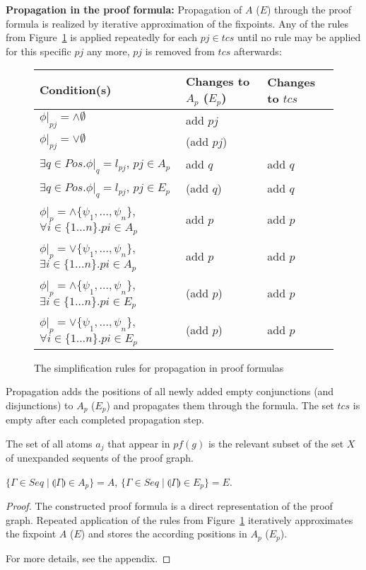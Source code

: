 \documentclass{llncs}
\newcommand{\ind}[1]{\llparenthesis #1 \rrparenthesis}
\begin{document}
\noindent\textbf{Propagation in the proof formula:}
Propagation of $A$ ($E$) through the proof formula is realized by iterative approximation of the
fixpoints. 
Any of the rules from Figure~\ref{fig:propagation} is applied repeatedly for each $pj\in tcs$ until
no rule may be applied for this specific $pj$ any more, $pj$ is removed from $tcs$ afterwards:
\begin{footnotesize}
\begin{figure}[!h]
  \begin{center}
\begin{tabular}{| l | l | l |}
\hline
Condition(s) & Changes to $A_p$ ($E_p$) & Changes to $tcs$\\
\hline
$\phi|_{pj}=\wedge\emptyset$ & add $pj$&\\
\hline
$\phi|_{pj}=\vee\emptyset$ & (add $pj$)&\\
\hline
$\exists q\in Pos.\phi|_{q}=l_{pj}$, $pj\in A_p$ & add $q$ & add $q$\\
\hline
$\exists q\in Pos.\phi|_{q}=l_{pj}$, $pj\in E_p$ & (add $q$) & add $q$\\
\hline
$\phi|_{p}=\wedge\{\psi_1,\ldots,\psi_n\}$, $\forall i\in\{1\ldots n\}. pi\in A_p$ & add $p$ & add $p$\\
\hline
$\phi|_{p}=\vee\{\psi_1,\ldots,\psi_n\}$, $\exists i\in\{1\ldots n\}. pi\in A_p$ & add $p$ & add $p$\\
\hline
$\phi|_{p}=\wedge\{\psi_1,\ldots,\psi_n\}$, $\exists i\in\{1\ldots n\}. pi\in E_p$ & (add $p$) & add $p$\\
\hline
$\phi|_{p}=\vee\{\psi_1,\ldots,\psi_n\}$, $\forall i\in\{1\ldots n\}. pi\in E_p$ & (add $p$) & add $p$\\
\hline
 \end{tabular}
  \end{center}
  \caption{The simplification rules for propagation in proof formulas}
  \label{fig:propagation}
\end{figure}
\end{footnotesize}

Propagation adds the positions of all newly added empty conjunctions (and disjunctions) to
$A_p$ ($E_p$) and propagates them through the formula. The set $tcs$ is empty after each
completed propagation step.

The set of all atoms $a_j$ that appear in $pf(g)$ is the relevant subset of the set $X$ of
unexpanded sequents of the proof graph.

\begin{lemma}
$\{\Gamma\in Seq\mid \ind{\Gamma}\in A_p\} = A$, $\{\Gamma\in Seq\mid \ind{\Gamma}\in E_p\} = E.$

\begin{proof}
The constructed proof formula is a direct representation of the proof graph. 
Repeated application of the rules from Figure~\ref{fig:propagation} iteratively approximates the
fixpoint $A$ ($E$) and stores the according positions in $A_p$ ($E_p$).

For more details, see the appendix.
\end{proof}
\end{lemma}
\end{document}
